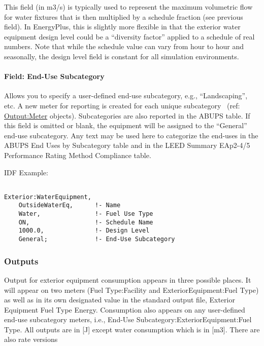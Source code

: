 This field (in m3/s) is typically used to represent the maximum volumetric flow for water fixtures that is then multiplied by a schedule fraction (see previous field). In EnergyPlus, this is slightly more flexible in that the exterior water equipment design level could be a ``diversity factor'' applied to a schedule of real numbers. Note that while the schedule value can vary from hour to hour and seasonally, the design level field is constant for all simulation environments.

\paragraph{Field: End-Use Subcategory}\label{field-end-use-subcategory-2}

Allows you to specify a user-defined end-use subcategory, e.g., ``Landscaping'', etc. A new meter for reporting is created for each unique subcategory~ (ref: \hyperref[outputmeter-and-outputmetermeterfileonly]{Output:Meter} objects). Subcategories are also reported in the ABUPS table. If this field is omitted or blank, the equipment will be assigned to the ``General'' end-use subcategory. Any text may be used here to categorize the end-uses in the ABUPS End Uses by Subcategory table and in the LEED Summary EAp2-4/5 Performance Rating Method Compliance table.

IDF Example:

\begin{lstlisting}

Exterior:WaterEquipment,
    OutsideWaterEq,      !- Name
    Water,               !- Fuel Use Type
    ON,                  !- Schedule Name
    1000.0,              !- Design Level
    General;             !- End-Use Subcategory
\end{lstlisting}


\subsubsection{Outputs}\label{outputs-1-010}

Output for exterior equipment consumption appears in three possible places. It will appear on two meters (Fuel Type:Facility and ExteriorEquipment:Fuel Type) as well as in its own designated value in the standard output file, Exterior Equipment Fuel Type Energy. Consumption also appears on any user-defined end-use subcategory meters, i.e., End-Use Subcategory:ExteriorEquipment:Fuel Type. All outputs are in {[}J{]} except water consumption which is in {[}m3{]}. There are also rate versions

